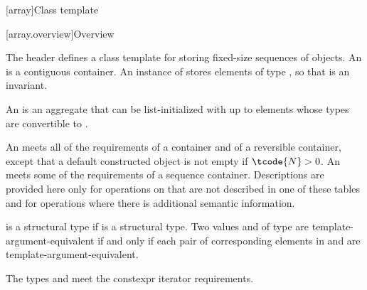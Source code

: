 [array]{Class template }
%

[array.overview]{Overview}

\pnum
{}%
The header  defines a class template for storing fixed-size
sequences of objects.
An  is a contiguous container.
An instance of  stores  elements of type ,
so that  is an invariant.

\pnum
{}%
%
An  is an aggregate that can be
list-initialized with up
to  elements whose types are convertible to .

\pnum
{}%
An  meets all of the requirements
of a container and
of a reversible container,
except that a default
constructed  object is not empty if $\tcode{N} > 0$.
An  meets some of the requirements of a sequence
container.
Descriptions are provided here
only for operations on  that are not described in
one of these tables and
for operations where there is additional semantic information.

\pnum
{} is a structural type if
 is a structural type.
Two values  and  of type 
are template-argument-equivalent if and only if
each pair of corresponding elements in  and 
are template-argument-equivalent.

\pnum
The types  and  meet
the constexpr iterator requirements.

